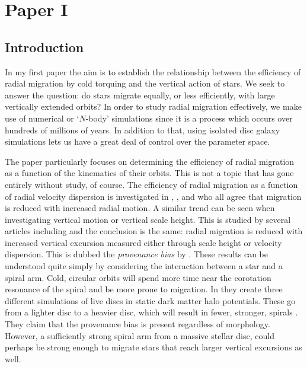 \chapter{Paper I}\label{chap:paper1}
\section{Introduction}\label{sec:p1-intro}
In my first paper the aim is to establish the relationship between the efficiency of radial migration by cold torquing and the vertical action of stars. We seek to answer the question: do stars migrate equally, or less efficiently, with large vertically extended orbits? In order to study radial migration effectively, we make use of numerical or `$N$-body' simulations since it is a process which occurs over hundreds of millions of years. In addition to that, using isolated disc galaxy simulations lets us have a great deal of control over the parameter space. 

The paper particularly focuses on determining the efficiency of radial migration as a function of the kinematics of their orbits. This is not a topic that has gone entirely without study, of course. The efficiency of radial migration as a function of radial velocity dispersion is investigated in \cite{solway:12}, \cite{vera-ciro:14}, and \cite{daniel:18} who all agree that migration is reduced with increased radial motion. A similar trend can be seen when investigating vertical motion or vertical scale height. This is studied by several articles including \cite{solway:12, vera-ciro:14, halle:2015, vera-ciro:16b} and the conclusion is the same: radial migration is reduced with increased vertical excursion measured either through scale height or velocity dispersion. This is dubbed the \textit{provenance bias} by \cite{vera-ciro:14}. These results can be understood quite simply by considering the interaction between a star and a spiral arm. Cold, circular orbits will spend more time near the corotation resonance of the spiral and be more prone to migration. In \cite{vera-ciro:16b} they create three different simulations of live discs in static dark matter halo potentials. These go from a lighter disc to a heavier disc, which will result in fewer, stronger, spirals \citep{donghia:15}. They claim that the provenance bias is present regardless of morphology. However, a sufficiently strong spiral arm from a massive stellar disc, could perhaps be strong enough to migrate stars that reach larger vertical excursions as well. 

